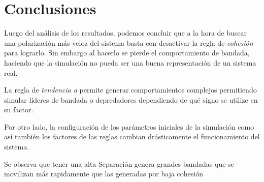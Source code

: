 \documentclass[a4paper]{article}
\begin{document}
    \section{Conclusiones}
            Luego del análisis de los resultados, podemos concluir que a la hora de buscar una polarización más veloz del sistema basta con desactivar la regla de \textit{cohesión} para lograrlo.
            Sin embargo al hacerlo se pierde el comportamiento de bandada, haciendo que la simulación no pueda ser una buena representación de un sistema real.

            La regla de \textit{tendencia a} permite generar comportamientos complejos permitiendo simular líderes de bandada o depredadores dependiendo de qué signo se utilize en su factor.

            Por otro lado, la configuración de los parámetros iniciales de la simulación como así también los factores de las reglas cambian drásticamente el funcionamiento del sistema.

            Se observa que tener una alta Separación genera grandes bandadas que se movilizan más rapidamente que las generadas por baja cohesión
    \clearpage \printbibliography
\end{document}
